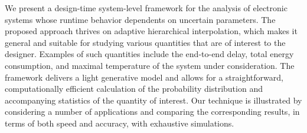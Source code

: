 We present a design-time system-level framework for the analysis of electronic
systems whose runtime behavior dependents on uncertain parameters. The proposed
approach thrives on adaptive hierarchical interpolation, which makes it general
and suitable for studying various quantities that are of interest to the
designer. Examples of such quantities include the end-to-end delay, total energy
consumption, and maximal temperature of the system under consideration. The
framework delivers a light generative model and allows for a straightforward,
computationally efficient calculation of the probability distribution and
accompanying statistics of the quantity of interest. Our technique is
illustrated by considering a number of applications and comparing the
corresponding results, in terms of both speed and accuracy, with exhaustive
simulations.
